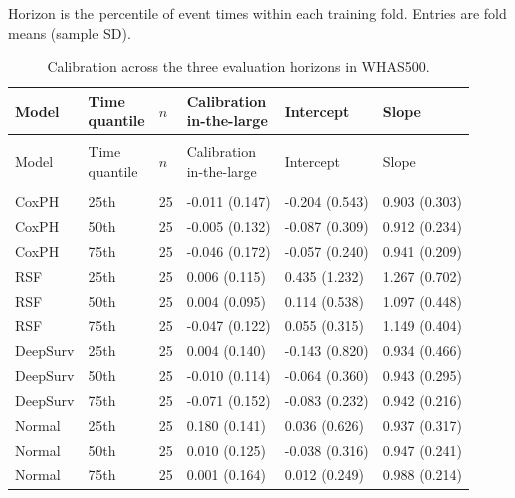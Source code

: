 \noindent Horizon is the percentile of event times within each training fold. Entries are fold means (sample SD).\par\endgroup
\clearpage\begingroup\singlespacing\footnotesize
\setlength{\LTpre}{6pt}\setlength{\LTpost}{6pt}
\begin{longtable}{@{}>{\raggedright\arraybackslash}p{3.1cm}>{\raggedright\arraybackslash}p{1.3cm}p{0.5cm}p{2.9cm}p{2.9cm}p{2.9cm}@{}}
\caption{Calibration across the three evaluation horizons in WHAS500.}\label{tab:calibration-all-whas500}\\
\toprule Model & \shortstack[l]{Time\\quantile} & $n$ & \shortstack[l]{Calibration\\in-the-large} & Intercept & Slope \\\midrule\endfirsthead
\multicolumn{6}{l}{\tablename\ \thetable\ (continued)}\\
\toprule Model & \shortstack[l]{Time\\quantile} & $n$ & \shortstack[l]{Calibration\\in-the-large} & Intercept & Slope \\\midrule\endhead
\midrule\multicolumn{6}{r}{Continued on next page}\\\endfoot
\bottomrule\endlastfoot
CoxPH & 25th & 25 & -0.011 (0.147) & -0.204 (0.543) & 0.903 (0.303) \\
CoxPH & 50th & 25 & -0.005 (0.132) & -0.087 (0.309) & 0.912 (0.234) \\
CoxPH & 75th & 25 & -0.046 (0.172) & -0.057 (0.240) & 0.941 (0.209) \\
RSF & 25th & 25 & 0.006 (0.115) & 0.435 (1.232) & 1.267 (0.702) \\
RSF & 50th & 25 & 0.004 (0.095) & 0.114 (0.538) & 1.097 (0.448) \\
RSF & 75th & 25 & -0.047 (0.122) & 0.055 (0.315) & 1.149 (0.404) \\
DeepSurv & 25th & 25 & 0.004 (0.140) & -0.143 (0.820) & 0.934 (0.466) \\
DeepSurv & 50th & 25 & -0.010 (0.114) & -0.064 (0.360) & 0.943 (0.295) \\
DeepSurv & 75th & 25 & -0.071 (0.152) & -0.083 (0.232) & 0.942 (0.216) \\
Normal & 25th & 25 & 0.180 (0.141) & 0.036 (0.626) & 0.937 (0.317) \\
Normal & 50th & 25 & 0.010 (0.125) & -0.038 (0.316) & 0.947 (0.241) \\
Normal & 75th & 25 & 0.001 (0.164) & 0.012 (0.249) & 0.988 (0.214) \\

\end{longtable}
